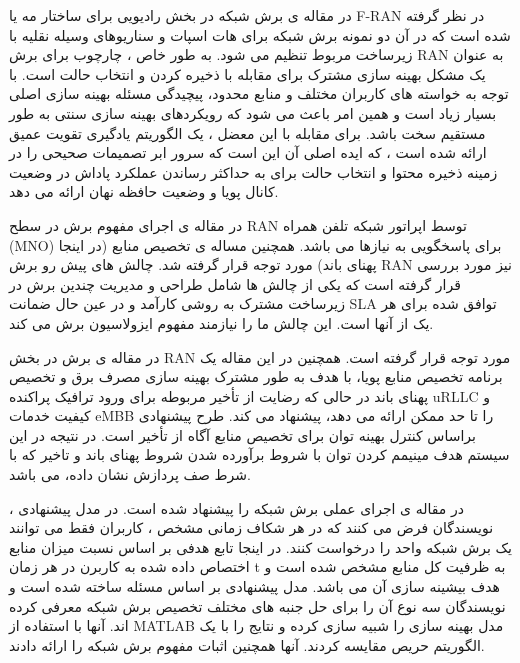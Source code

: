 در مقاله ی 
\cite{fran}
برش شبکه در بخش رادیویی برای ساختار مه 
 یا F-RAN
  در نظر گرفته شده است که در آن دو نمونه برش شبکه برای هات اسپات و سناریوهای وسیله نقلیه با زیرساخت مربوط تنظیم می شود. به طور خاص ، چارچوب برای برش RAN به عنوان یک مشکل بهینه سازی مشترک برای مقابله با ذخیره کردن و انتخاب حالت است.
  با توجه به خواسته های کاربران مختلف و منابع محدود، پیچیدگی مسئله بهینه سازی اصلی بسیار زیاد است و همین امر باعث می شود که رویکردهای بهینه سازی سنتی به طور مستقیم سخت باشد.
 برای مقابله با این معضل ، یک الگوریتم یادگیری تقویت عمیق ارائه شده است ، که ایده اصلی آن این است که سرور ابر تصمیمات صحیحی را در زمینه ذخیره محتوا و انتخاب حالت برای به حداکثر رساندن عملکرد پاداش در وضعیت کانال پویا و وضعیت حافظه نهان ارائه می دهد.

در مقاله ی 
\cite{ranSlice, ranSlice1}
اجرای مفهوم برش در سطح RAN توسط اپراتور شبکه تلفن همراه (MNO) برای پاسخگویی به نیازها می باشد. همچنین مساله ی تخصیص منابع (در اینجا پهنای باند) مورد توجه قرار گرفته شد.
چالش های پیش رو برش RAN نیز مورد بررسی قرار گرفته است که یکی از چالش ها
شامل طراحی و مدیریت چندین برش در زیرساخت مشترک به روشی کارآمد و در عین حال ضمانت SLA توافق شده برای هر یک از آنها است.
این چالش ما را نیازمند مفهوم ایزولاسیون برش می کند.

در مقاله ی 
\cite{ranslice2}
برش در بخش RAN مورد توجه قرار گرفته است.
همچنین
در این مقاله یک برنامه تخصیص منابع پویا، با هدف به طور مشترک بهینه سازی مصرف برق و تخصیص پهنای باند در حالی که رضایت از تأخیر مربوطه برای ورود ترافیک پراکنده uRLLC و کیفیت خدمات eMBB را تا حد ممکن ارائه می دهد، پیشنهاد می کند.
طرح پیشنهادی براساس کنترل بهینه توان برای تخصیص منابع آگاه از تأخیر است.
در نتیجه در این سیستم هدف مینیمم کردن توان با شروط برآورده شدن شروط پهنای باند و  تاخیر که با شرط صف پردازش نشان داده، می باشد.

در مقاله ی 
\cite{onet}
اجرای عملی برش شبکه را پیشنهاد شده است.
در مدل پیشنهادی ، نویسندگان فرض می کنند که در هر شکاف زمانی مشخص ، کاربران فقط می توانند یک برش شبکه واحد را درخواست کنند.
در اینجا تابع هدفی بر اساس نسبت میزان منابع اختصاص داده شده به کاربرن در هر زمان t به ظرفیت کل منابع مشخص شده است و هدف بیشینه سازی آن  می باشد.  
مدل پیشنهادی بر اساس مسئله  ساخته شده است و نویسندگان سه نوع  آن را برای حل جنبه های مختلف تخصیص برش شبکه معرفی کرده اند.
آنها با استفاده از MATLAB مدل بهینه سازی را شبیه سازی کرده و نتایج را با یک الگوریتم حریص مقایسه کردند. آنها همچنین اثبات مفهوم برش شبکه را ارائه دادند.

